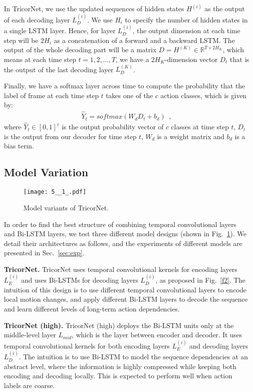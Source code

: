 \documentclass{article}
\begin{document}
In TricorNet, we use the updated sequences of hidden states $H^{(i)}$ as the output of each decoding layer $L_{D}^{(i)}$.  We use $H_i$ to specify the number of hidden states in a single LSTM layer. Hence, for layer $L_{D}^{(i)}$, the output dimension at each time step will be $2H_i$ as a concatenation of a forward and a backward LSTM. The output of the whole decoding part will be a matrix $D = H^{(K)} \in \mathbb{R}^{T \times 2H_K}$, which means at each time step $t = 1,2,\dots,T$, we have a $2H_K$-dimension vector $D_t$ that is the output of the last decoding layer $L_{D}^{(K)}$.

Finally, we have a softmax layer across time to compute the probability that the label of frame at each time step $t$ takes one of the $c$ action classes, which is given by: 
\begin{align}
\hat Y_t = softmax(W_dD_t+b_d)
\enspace,
\end{align}
where $\hat Y_t \in [0, 1]^c$ is the output probability vector of $c$ classes at time step $t$, $D_t$ is the output from our decoder for time step $t$, $W_d$ is a weight matrix and $b_d$ is a bias term. 

\subsection{Model Variation}

\begin{figure}[t]
\centering
\texttt{[image: 5\_\_1\_.pdf]}
\caption{Model variants of TricorNet.}
\label{f5}
\end{figure}

In order to find the best structure of combining temporal convolutional layers and Bi-LSTM layers, we test three different model designs (shown in Fig.~\ref{f5}). We detail their architectures as follows, and the experiments of different models are presented in Sec.~\ref{sec:exp}.

\noindent \textbf{TricorNet.} \quad TricorNet uses temporal convolutional kernels for encoding layers $L_{E}^{(i)}$ and uses Bi-LSTMs for decoding layers $L_{D}^{(i)}$, as proposed in Fig.~\ref{f2}. The intuition of this design is to use different temporal convolutional layers to encode local motion changes, and apply different Bi-LSTM layers to decode the sequence and learn different levels of long-term action dependencies.

\noindent \textbf{TricorNet (high).} \quad TricorNet (high) deploys the Bi-LSTM units only at the middle-level layer $L_{mid}$, which is the layer between encoder and decoder. It uses temporal convolutional kernels for both encoding layers $L_{E}^{(i)}$ and decoding layers $L_{D}^{(i)}$. The intuition is to use Bi-LSTM to model the sequence dependencies at an abstract level, where the information is highly compressed while keeping both encoding and decoding locally. This is expected to perform well when action labels are coarse.
\end{document}
